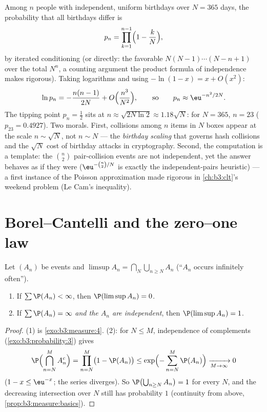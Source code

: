 \begin{example}
\label{ex:b3:probability:birthday}
Among $n$ people with independent, uniform birthdays over
$N = 365$ days, the probability that all birthdays differ is
\[
p_n = \prod_{k=1}^{n-1}\Bigl(1 - \frac kN\Bigr),
\]
by iterated conditioning (or directly: the favorable
$N(N-1)\cdots(N - n + 1)$ over the total $N^n$, a counting
argument the product formula of independence makes
rigorous). Taking logarithms and using $-\ln(1 - x) = x +
O(x^2)$:
\[
\ln p_n = -\frac{n(n-1)}{2N} +
O\Bigl(\frac{n^3}{N^2}\Bigr),
\qquad\text{so}\qquad
p_n \approx \eu^{-n^2/2N} .
\]
The tipping point $p_n = \frac12$ sits at $n \approx
\sqrt{2N\ln2} \approx 1.18\sqrt N$: for $N = 365$, $n = 23$
($p_{23} = 0.4927$). Two morals. First, collisions among $n$
items in $N$ boxes appear at the scale $n \sim \sqrt N$, not
$n \sim N$ --- the \emph{birthday scaling} that governs hash
collisions and the $\sqrt N$ cost of birthday attacks in
cryptography. Second, the computation is a template: the
$\binom n2$ pair-collision events are not independent, yet
the answer behaves as if they were
($\eu^{-\binom n2/N}$ is exactly the independent-pairs
heuristic) --- a first instance of the Poisson
approximation made rigorous in \cref{ch:b3:clt}'s weekend
problem (Le Cam's inequality).
\end{example}

\section{Borel--Cantelli and the zero--one law}

\begin{theorem}
\label{thm:b3:probability:borelcantelli}
Let $(A_n)$ be events and $\limsup A_n = \bigcap_N
\bigcup_{n\geq N}A_n$ (``$A_n$ occurs infinitely
often'').
\begin{enumerate}
  \item If $\sum\P(A_n) < \infty$, then $\P(\limsup A_n) =
        0$.
  \item If $\sum\P(A_n) = \infty$ \emph{and the $A_n$ are
        independent}, then $\P(\limsup A_n) = 1$.
\end{enumerate}
\end{theorem}

\begin{proof}
(1) is \cref{exo:b3:measure:4}. (2): for $N \leq M$,
independence of complements (\cref{exo:b3:probability:3})
gives
\[
\P\Bigl(\bigcap_{n=N}^{M}A_n^c\Bigr) = \prod_{n=N}^M\bigl(1
- \P(A_n)\bigr) \leq
\exp\Bigl(-\sum_{n=N}^M\P(A_n)\Bigr) \xrightarrow[M \to
\infty]{} 0
\]
($1 - x \leq \eu^{-x}$; the series diverges). So
$\P\bigl(\bigcup_{n\geq N}A_n\bigr) = 1$ for every $N$, and
the decreasing intersection over $N$ still has probability
$1$ (continuity from above, \cref{prop:b3:measure:basics}).
\end{proof}

